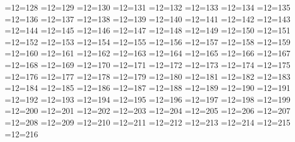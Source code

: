 =12=128
=12=129
=12=130
=12=131
=12=132
=12=133
=12=134
=12=135
=12=136
=12=137
=12=138
=12=139
=12=140
=12=141
=12=142
=12=143
=12=144
=12=145
=12=146
=12=147
=12=148
=12=149
=12=150
=12=151
=12=152
=12=153
=12=154
=12=155
=12=156
=12=157
=12=158
=12=159
=12=160
=12=161
=12=162
=12=163
=12=164
=12=165
=12=166
=12=167
=12=168
=12=169
=12=170
=12=171
=12=172
=12=173
=12=174
=12=175
=12=176
=12=177
=12=178
=12=179
=12=180
=12=181
=12=182
=12=183
=12=184
=12=185
=12=186
=12=187
=12=188
=12=189
=12=190
=12=191
=12=192
=12=193
=12=194
=12=195
=12=196
=12=197
=12=198
=12=199
=12=200
=12=201
=12=202
=12=203
=12=204
=12=205
=12=206
=12=207
=12=208
=12=209
=12=210
=12=211
=12=212
=12=213
=12=214
=12=215
=12=216
